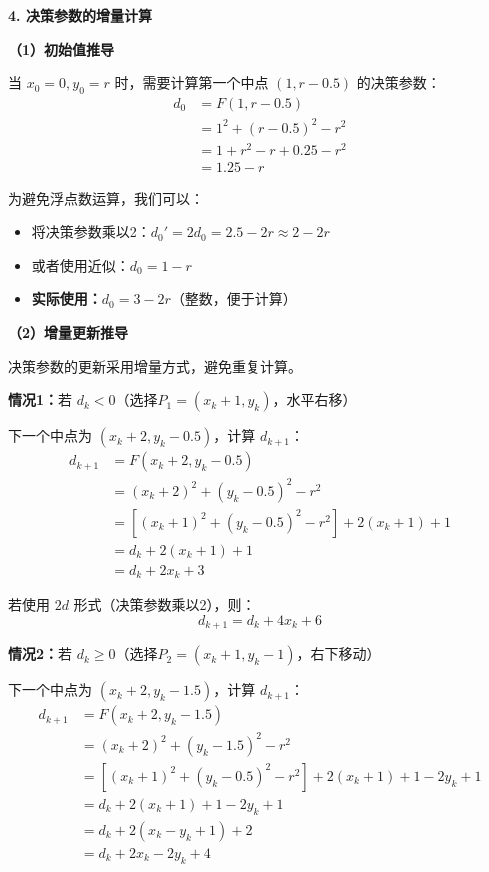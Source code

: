 ﻿\documentclass[12pt,a4paper]{article}
\begin{document}
\begin{tcolorbox}[breakable]
\textbf{4. 决策参数的增量计算}

\textbf{（1）初始值推导}

当 $x_0=0, y_0=r$ 时，需要计算第一个中点 $(1, r-0.5)$ 的决策参数：
\begin{align}
d_0 &= F(1, r-0.5) \\
&= 1^2 + (r-0.5)^2 - r^2 \\
&= 1 + r^2 - r + 0.25 - r^2 \\
&= 1.25 - r
\end{align}

为避免浮点数运算，我们可以：
\begin{itemize}
\item 将决策参数乘以2：$d_0' = 2d_0 = 2.5 - 2r \approx 2 - 2r$
\item 或者使用近似：$d_0 = 1 - r$
\item \textbf{实际使用：}$d_0 = 3 - 2r$（整数，便于计算）
\end{itemize}

\textbf{（2）增量更新推导}

决策参数的更新采用增量方式，避免重复计算。

\textbf{情况1：}若 $d_k < 0$（选择$P_1 = (x_k+1, y_k)$，水平右移）

下一个中点为 $(x_k+2, y_k-0.5)$，计算 $d_{k+1}$：
\begin{align}
d_{k+1} &= F(x_k+2, y_k-0.5) \\
&= (x_k+2)^2 + (y_k-0.5)^2 - r^2 \\
&= \left[(x_k+1)^2 + (y_k-0.5)^2 - r^2\right] + 2(x_k+1) + 1 \\
&= d_k + 2(x_k+1) + 1 \\
&= d_k + 2x_k + 3
\end{align}

若使用 $2d$ 形式（决策参数乘以2），则：
\begin{equation}
\boxed{d_{k+1} = d_k + 4x_k + 6}
\end{equation}

\textbf{情况2：}若 $d_k \geq 0$（选择$P_2 = (x_k+1, y_k-1)$，右下移动）

下一个中点为 $(x_k+2, y_k-1.5)$，计算 $d_{k+1}$：
\begin{align}
d_{k+1} &= F(x_k+2, y_k-1.5) \\
&= (x_k+2)^2 + (y_k-1.5)^2 - r^2 \\
&= \left[(x_k+1)^2 + (y_k-0.5)^2 - r^2\right] + 2(x_k+1) + 1 - 2y_k + 1 \\
&= d_k + 2(x_k+1) + 1 - 2y_k + 1 \\
&= d_k + 2(x_k - y_k + 1) + 2 \\
&= d_k + 2x_k - 2y_k + 4
\end{align}


\end{tcolorbox}
\end{document}
